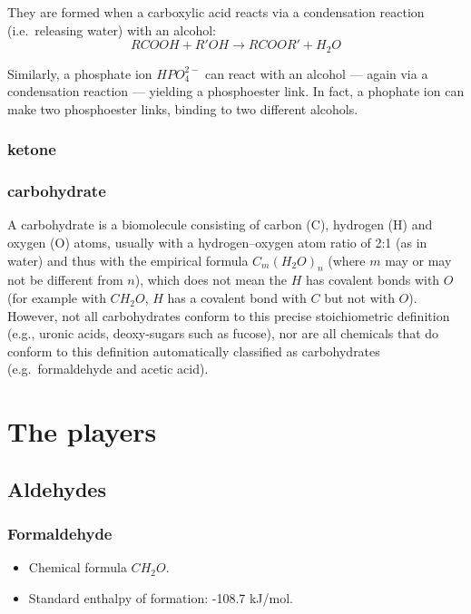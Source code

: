 \documentclass{article}
\begin{document}
They are formed when a carboxylic acid reacts via a condensation reaction (i.e.\ releasing
water) with an alcohol:
\[
    RCOOH + R'OH \rightarrow RCOOR' + H_2O
\]

Similarly, a phosphate ion $HPO_4^{2-}$ can react with an alcohol --- again via a
condensation reaction --- yielding a phosphoester link. In fact, a phophate ion can make
two phosphoester links, binding to two different alcohols.

\subsubsection{ketone}

\subsubsection{carbohydrate}
A carbohydrate is a biomolecule consisting of carbon (C), hydrogen (H) and oxygen (O)
atoms, usually with a hydrogen–oxygen atom ratio of 2:1 (as in water) and thus with the
empirical formula $C_m{(H_2O)}_n$ (where $m$ may or may not be different from $n$), which does
not mean the $H$ has covalent bonds with $O$ (for example with $CH_2O$, $H$ has a covalent bond
with $C$ but not with $O$). However, not all carbohydrates conform to this precise
stoichiometric definition (e.g., uronic acids, deoxy-sugars such as fucose), nor are all
chemicals that do conform to this definition automatically classified as carbohydrates
(e.g.\ formaldehyde and acetic acid).


\pagebreak
\section{The players}\label{sec_players}

\subsection{Aldehydes}

\subsubsection{Formaldehyde}

\begin{itemize}
    \item Chemical formula $CH_2O$.
    \item Standard enthalpy of formation: -108.7 kJ/mol.
\end{itemize}
\end{document}
